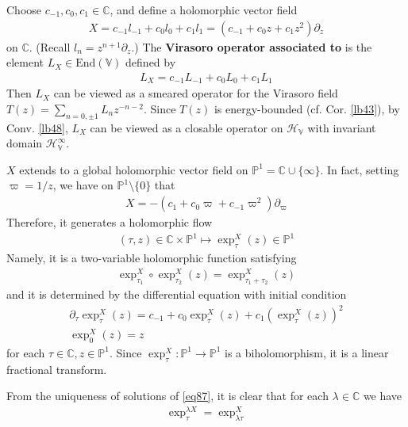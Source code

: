 \documentclass[12pt,b5paper,notitlepage]{article}
\theoremstyle{definition}
\theoremstyle{plain}
\newcommand{\End}{\mathrm{End}} %
\newcommand{\Vbb}{\mathbb V}
\newcommand{\Cbb}{\mathbb C}
\newcommand{\Pbb}{\mathbb P}
\newcommand{\HV}{\mathcal H_{\mathbb V}}
\numberwithin{equation}{section}
\begin{document}
Choose $c_{-1},c_0,c_1\in\Cbb$, and define a holomorphic vector field
\begin{align}\label{eq83}
X=c_{-1}l_{-1}+c_0l_0+c_1l_1=(c_{-1}+c_0z+c_1z^2)\partial_z
\end{align}
on $\Cbb$. (Recall $l_n=z^{n+1}\partial_z$.) The \textbf{Virasoro operator associated to } is the element $L_X\in\End(\Vbb)$ defined by 
\begin{align}
L_X=c_{-1}L_{-1}+c_0L_0+c_1L_1
\end{align}
Then $L_X$ can be viewed as a smeared operator for the Virasoro field $T(z)=\sum_{n=0,\pm1}L_nz^{-n-2}$. Since $T(z)$ is energy-bounded (cf. Cor. \ref{lb43}), by Conv. \ref{lb48}, $L_X$ can be viewed as a closable operator on $\HV$ with invariant domain $\HV^\infty$.



$X$ extends to a global holomorphic vector field on $\Pbb^1=\Cbb\cup\{\infty\}$. In fact, setting $\varpi=1/z$, we have on $\Pbb^1\setminus\{0\}$ that
\begin{align}\label{eqb7}
X=-(c_1+c_0\varpi+c_{-1}\varpi^2)\partial_\varpi
\end{align}
Therefore, it generates a holomorphic flow 
\begin{align}
(\tau,z)\in\Cbb\times\Pbb^1\mapsto \exp^X_\tau(z)\in\Pbb^1
\end{align}
Namely, it is a two-variable holomorphic function satisfying
\begin{align}\label{eq100}
\exp^X_{\tau_1}\circ\exp^X_{\tau_2}(z)=\exp^X_{\tau_1+\tau_2}(z)
\end{align}
and it is determined by the differential equation with initial condition
\begin{subequations}\label{eq87}
\begin{gather}
\partial_\tau\exp^X_\tau(z)=c_{-1}+c_0\exp^X_\tau(z)+c_1(\exp^X_\tau(z))^2\label{eq87a}\\
\exp_0^X(z)=z
\end{gather}
\end{subequations}
for each $\tau\in\Cbb,z\in\Pbb^1$. Since $\exp_\tau^X:\Pbb^1\rightarrow\Pbb^1$ is a biholomorphism, it is a linear fractional transform. 


From the uniqueness of solutions of \eqref{eq87}, it is clear that for each $\lambda\in\Cbb$ we have
\begin{align}
\exp^{\lambda X}_\tau=\exp^X_{\lambda\tau}
\end{align}
\end{document}
